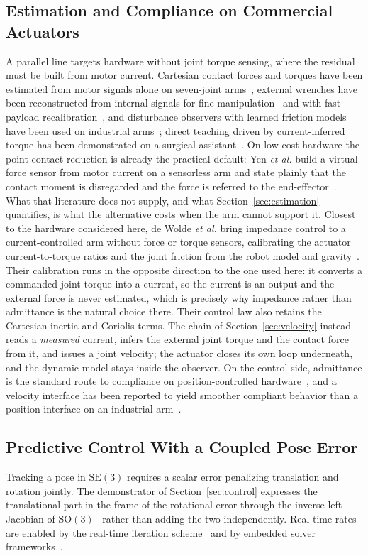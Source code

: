 \documentclass{ieeeaccess}
\newcommand{\SEthree}{\mathrm{SE}(3)}
\begin{document}
\subsection{Estimation and Compliance on Commercial Actuators}
A parallel line targets hardware without joint torque sensing, where the residual
must be built from motor current. Cartesian contact forces and torques have been
estimated from motor signals alone on seven-joint
arms~\cite{wahrburg2018motorcurrent}, external wrenches have been reconstructed
from internal signals for fine manipulation~\cite{shan2024fine} and with fast
payload recalibration~\cite{shan2024payload}, and disturbance observers with
learned friction models have been used on industrial
arms~\cite{liu2021sensorless}; direct teaching driven by current-inferred torque
has been demonstrated on a surgical assistant~\cite{zhang2021forcefree}. On
low-cost hardware the point-contact reduction is already the practical default:
Yen \emph{et al.} build a virtual force sensor from motor current on a sensorless
arm and state plainly that the contact moment is disregarded and the force is
referred to the end-effector~\cite{yen2019virtual}. What that literature does not
supply, and what Section~\ref{sec:estimation} quantifies, is what the alternative
costs when the arm cannot support it. Closest
to the hardware considered here, de Wolde \emph{et al.} bring impedance control to
a current-controlled arm without force or torque sensors, calibrating the actuator
current-to-torque ratios and the joint friction from the robot model and
gravity~\cite{dewolde2024current}. Their calibration runs in the opposite direction
to the one used here: it converts a commanded joint torque into a current, so the
current is an output and the external force is never estimated, which is precisely
why impedance rather than admittance is the natural choice there. Their control law
also retains the Cartesian inertia and Coriolis terms. The chain of
Section~\ref{sec:velocity} instead reads a \emph{measured} current, infers the
external joint torque and the contact force from it, and issues a joint velocity;
the actuator closes its own loop underneath, and the dynamic model stays inside
the observer. On the
control side, admittance is the standard route to compliance on
position-controlled hardware~\cite{keemink2018admittance,zhu2025compliantsurvey},
and a velocity interface has been reported to yield smoother compliant behavior
than a position interface on an industrial arm~\cite{scherzinger2022fdcc}.

\subsection{Predictive Control With a Coupled Pose Error}
Tracking a pose in $\SEthree$ requires a scalar error penalizing translation and
rotation jointly. The demonstrator of Section~\ref{sec:control} expresses the
translational part in the frame of the rotational error through the inverse left
Jacobian of $\mathrm{SO}(3)$~\cite{sola2018microlie} rather than adding the two
independently. Real-time rates are enabled by the real-time iteration
scheme~\cite{diehl2005rti} and by embedded solver
frameworks~\cite{verschueren2022acados,andersson2019casadi,frison2020hpipm}.
\end{document}
